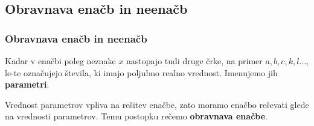     \subsection{Obravnava enačb in neenačb}

        \begin{frame}
            \frametitle{Obravnava enačb in neenačb}

            \begin{block}{}
                Kadar v enačbi poleg neznake $x$ nastopajo tudi druge črke, na primer $a, b, c, k, l ...$, 
                le-te označujejo števila, ki imajo poljubno realno vrednost. Imenujemo jih \textbf{parametri}.
            \end{block}

            \begin{block}{}
                Vrednost parametrov vpliva na rešitev enačbe, zato moramo enačbo reševati glede na vrednosti parametrov.
                Temu postopku rečemo \textbf{obravnava enačbe}.
            \end{block}
        \end{frame}



        \begin{frame}
        \end{frame}

